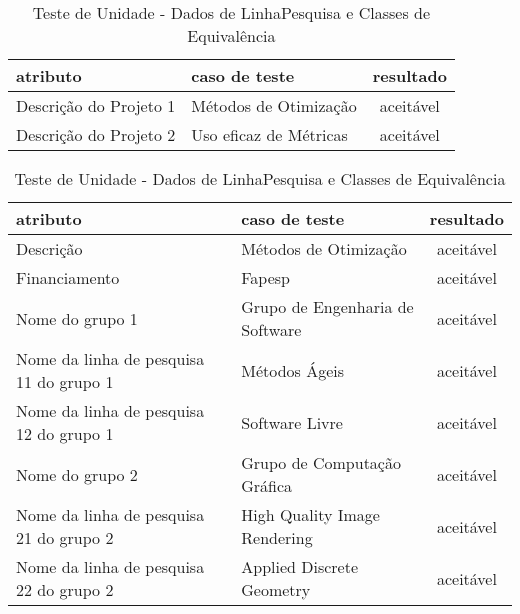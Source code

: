 \documentclass[11pt, a4paper]{book}
\begin{document}
\begin{table}
\renewcommand{\arraystretch}{1.3}
 \caption{Teste de Unidade - Dados de LinhaPesquisa e Classes de Equivalência}
  \label{tab:table3}
\centering
\begin{tabular}[htb]{l|l|c}
\hline\hline
atributo & caso de teste & resultado\\
\hline
Descrição do Projeto 1 & Métodos de Otimização & aceitável \\
Descrição do Projeto 2 & Uso eficaz de Métricas & aceitável \\

\hline 
\end{tabular}
\end{table}


\begin{table}
\renewcommand{\arraystretch}{1.3}
 \caption{Teste de Unidade - Dados de LinhaPesquisa e Classes de Equivalência}
  \label{tab:table4}
\centering
\begin{tabular}[htb]{l|l|c}
\hline\hline
atributo & caso de teste & resultado\\
\hline
Descrição & Métodos de Otimização & aceitável \\
Financiamento & Fapesp & aceitável \\
Nome do grupo 1 & Grupo de Engenharia de Software & aceitável \\
Nome da linha de pesquisa 11 do grupo 1 & Métodos Ágeis & aceitável \\
Nome da linha de pesquisa 12 do grupo 1 & Software Livre & aceitável\\
Nome do grupo 2 & Grupo de Computação Gráfica & aceitável\\
Nome da linha de pesquisa 21 do grupo 2 & High Quality Image Rendering & aceitável\\
Nome da linha de pesquisa 22 do grupo 2 & Applied Discrete Geometry & aceitável\\
\hline 
\end{tabular}
\end{table}
\end{document}
